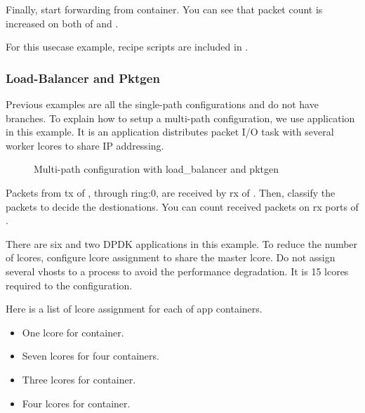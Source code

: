 \documentclass[a4paper,11pt,openany,oneside,english]{sphinxmanual}
\begin{document}
Finally, start forwarding from  container.
You can see that packet count is increased on both of
 and .

For this usecase example, recipe scripts are included in
.


\subsubsection{Load-Balancer and Pktgen}
\label{\detokenize{tools/sppc/usecases:load-balancer-and-pktgen}}\label{\detokenize{tools/sppc/usecases:sppc-usecases-lb-pktgen}}
Previous examples are all the single-path configurations and do not
have branches.
To explain how to setup a multi-path configuration, we use
application in this example.
It is an application distributes packet I/O task with several worker
lcores to share IP addressing.

\begin{figure}[htbp]
\centering
\capstart

\noindent{}
\caption{Multi-path configuration with load\_balancer and pktgen}\label{\detokenize{tools/sppc/usecases:id5}}\label{\detokenize{tools/sppc/usecases:figure-sppc-usecase-lb-pktgen}}\end{figure}

Packets from tx of , through ring:0, are received by rx
of .
Then,  classify the packets to decide the
destionations.
You can count received packets on rx ports of .

There are six  and two DPDK applications in this example.
To reduce the number of lcores, configure lcore assignment to share
the master lcore.
Do not assign several vhosts to a process to avoid the performance
degradation.
It is 15 lcores required to the configuration.

Here is a list of lcore assignment for each of app containers.
\begin{itemize}
\item {} 
One lcore for  container.

\item {} 
Seven lcores for four  containers.

\item {} 
Three lcores for  container.

\item {} 
Four lcores for  container.

\end{itemize}
\end{document}

